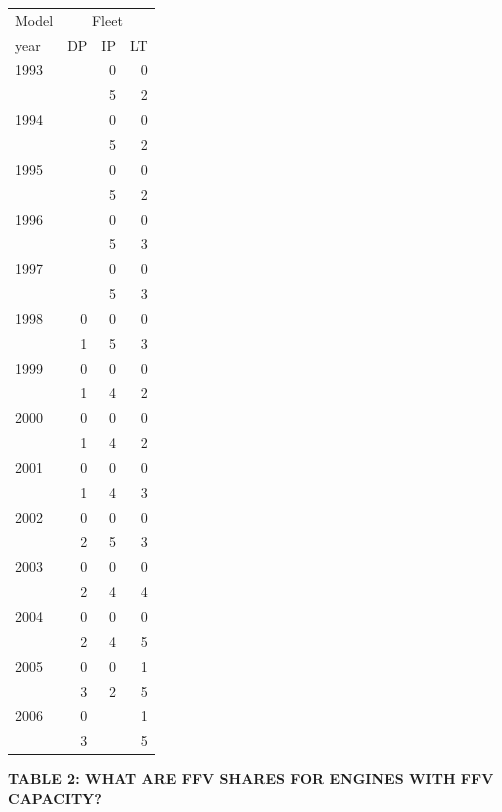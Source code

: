 \begin{tabular}{lrrr}
\toprule
Model & \multicolumn{3}{c}{Fleet} \\
year & DP & IP & LT \\
\midrule
1993 &  & 0 & 0 \\
 &  & 5 & 2 \\
1994 &  & 0 & 0 \\
 &  & 5 & 2 \\
1995 &  & 0 & 0 \\
 &  & 5 & 2 \\
1996 &  & 0 & 0 \\
 &  & 5 & 3 \\
1997 &  & 0 & 0 \\
 &  & 5 & 3 \\
1998 & 0 & 0 & 0 \\
 & 1 & 5 & 3 \\
1999 & 0 & 0 & 0 \\
 & 1 & 4 & 2 \\
2000 & 0 & 0 & 0 \\
 & 1 & 4 & 2 \\
2001 & 0 & 0 & 0 \\
 & 1 & 4 & 3 \\
2002 & 0 & 0 & 0 \\
 & 2 & 5 & 3 \\
2003 & 0 & 0 & 0 \\
 & 2 & 4 & 4 \\
2004 & 0 & 0 & 0 \\
 & 2 & 4 & 5 \\
2005 & 0 & 0 & 1 \\
 & 3 & 2 & 5 \\
2006 & 0 &  & 1 \\
 & 3 &  & 5 \\
\bottomrule
\end{tabular}

\vspace{1em}
\noindent\textbf{TABLE 2: WHAT ARE FFV SHARES FOR ENGINES WITH FFV CAPACITY?}
\vspace{0.5em}

